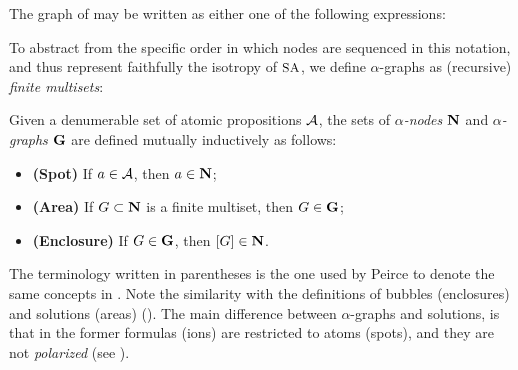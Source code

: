 \begin{example}
The graph of  may be written as either one of the
following expressions:
\end{example}

To abstract from the specific order in which nodes are sequenced in this
notation, and thus represent faithfully the isotropy of $\small\textsc{SA}$, we define
$\alpha$-graphs as (recursive) \emph{finite multisets}:

\begin{definition} 
  
  Given a denumerable set of atomic propositions $\mathcal{A}$, the sets of
  \emph{$\alpha$-nodes} $\mathbf{N}$ and \emph{$\alpha$-graphs} $\mathbf{G}$ are
  defined mutually inductively as follows:
  \begin{itemize}
    \item \textbf{(Spot)} If $a \in \mathcal{A}$, then $a \in \mathbf{N}$;
    \item \textbf{(Area)} If $G \subset \mathbf{N}$ is a finite multiset, then $G
    \in \mathbf{G}$;
    \item \textbf{(Enclosure)} If $G \in \mathbf{G}$, then $[G] \in \mathbf{N}$.
  \end{itemize}
\end{definition}
The terminology written in parentheses is the one used by Peirce to denote the
same concepts in \cite{peirce_prolegomena_1906}. Note the similarity with the
definitions of bubbles (enclosures) and solutions (areas) ().
The main difference between $\alpha$-graphs and solutions, is that in the former
formulas (ions) are restricted to atoms (spots), and they are not
\emph{polarized} (see ).


